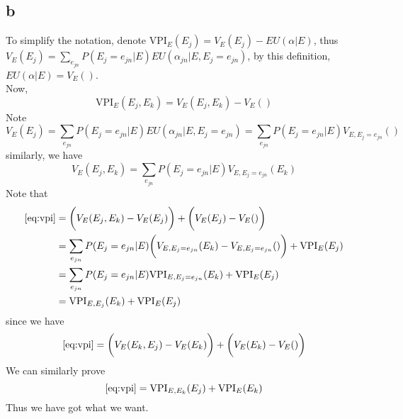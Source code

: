 \documentclass[12pt]{amsart}
\begin{document}
\subsection*{b}
To simplify the notation, denote $\mbox{VPI}_E(E_j) = V_E(E_j) - EU(\alpha|E)$,
thus $V_E(E_j) = \sum_{e_{jn}}P(E_j=e_{jn}|E)EU(\alpha_{jn}|E,E_j=e_{jn})$, by this definition,
$EU(\alpha|E) = V_E()$.\\
Now,
\begin{equation}
  \label{eq:vpi}
  \mbox{VPI}_E(E_j,E_k) = V_E(E_j,E_k)-V_E()
\end{equation}
Note
$$
V_E(E_j)  
=\sum_{e_{jn}}P(E_j=e_{jn}|E)EU(\alpha_{jn}|E,E_j=e_{jn})
=\sum_{e_{jn}}P(E_j=e_{jn}|E)V_{E,E_j=e_{jn}}()
$$
similarly, we have
$$
V_E(E_j,E_k) = \sum_{e_{jn}}P(E_j = e_{jn}|E)V_{E,E_j=e_{jn}}(E_k)
$$
Note that 
\begin{align*}
\eqref{eq:vpi} &= \bigg (V_E(E_j,E_k)- V_E(E_j)\bigg) + \bigg(V_E(E_j)- V_E()\bigg)\\
&= \sum_{e_{jn}}P(E_j = e_{jn}|E)\bigg(V_{E,E_j=e_{jn}}(E_k) - V_{E,E_j=e_{jn}}()\bigg) + \mbox{VPI}_E(E_j)\\
&= \sum_{e_{jn}}P(E_j = e_{jn}|E)\mbox{VPI}_{E,E_j=e_{jn}}(E_k) + \mbox{VPI}_E(E_j)\\
& = \mbox{VPI}_{E,E_j}(E_k) + \mbox{VPI}_E(E_j)
\end{align*}
since we have
$$
\eqref{eq:vpi} = \bigg (V_E(E_k,E_j)- V_E(E_k)\bigg) + \bigg(V_E(E_k)- V_E()\bigg)\\
$$
We can similarly prove
$$
\eqref{eq:vpi} = \mbox{VPI}_{E,E_k}(E_j) + \mbox{VPI}_E(E_k)
$$
Thus we have got what we want.
\end{document}
